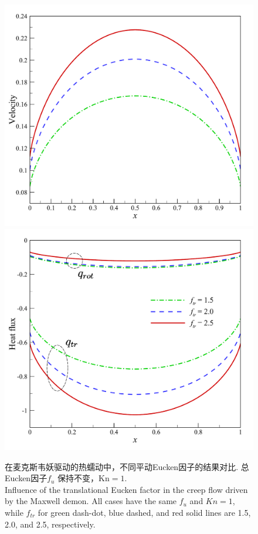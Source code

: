 \begin{figure}[t]
	\centering
	\includegraphics[scale=0.3,clip=true]{Fig/ThermalCreep_U_vf} 
	\includegraphics[scale=0.3,clip=true]{Fig/ThermalCreep_q_vf}
	\caption{
		在麦克斯韦妖驱动的热蠕动中，不同平动Eucken因子的结果对比. 总Eucken因子${f_{u}}$ 保持不变，$\text{Kn}=1$.\\
		Influence of the translational Eucken factor in the creep flow driven by the Maxwell demon. All cases have the same ${f_{u}}$ and ${Kn=1}$, while $f_{tr}$ for green dash-dot, blue dashed, and red solid lines are 1.5, 2.0, and 2.5, respectively.
	}
	\label{fig:thermalCreep_vary-f}
\end{figure}

